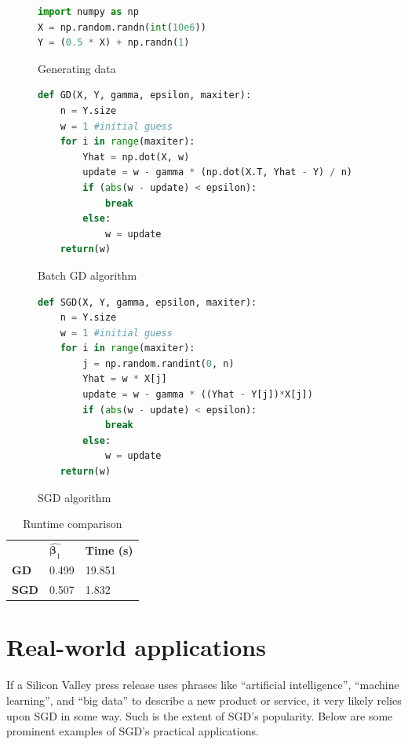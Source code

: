 \documentclass{report}
\begin{document}
\newpage

\begin{figure}[h!]
	\caption{Generating data}
\begin{lstlisting}[language=Python]
import numpy as np
X = np.random.randn(int(10e6))
Y = (0.5 * X) + np.randn(1)
\end{lstlisting}
\end{figure}

\begin{figure}[h!]
	\caption{Batch GD algorithm}
	\begin{lstlisting}[language=Python]
	def GD(X, Y, gamma, epsilon, maxiter):
	n = Y.size
	w = 1 #initial guess
	for i in range(maxiter):
		Yhat = np.dot(X, w)
		update = w - gamma * (np.dot(X.T, Yhat - Y) / n)
		if (abs(w - update) < epsilon): 
			break
		else:
			w = update
	return(w)
	\end{lstlisting}
\end{figure}

\begin{figure}[h!]
	\caption{SGD algorithm}
\begin{lstlisting}[language=Python]
def SGD(X, Y, gamma, epsilon, maxiter):
	n = Y.size
	w = 1 #initial guess
	for i in range(maxiter):
		j = np.random.randint(0, n)
		Yhat = w * X[j]
		update = w - gamma * ((Yhat - Y[j])*X[j])
		if (abs(w - update) < epsilon):
			break
		else:
			w = update
	return(w)
\end{lstlisting}
\end{figure}

\begin{table}[h!]
	\centering
	\caption{Runtime comparison}
	\begin{tabular}{|l l l|}
		\hline
		& $\hat{\bm{\beta}_1}$ & \textbf{Time (s)} \\
		\textbf{GD} & 0.499 & 19.851 \\
		\textbf{SGD} & 0.507 & 1.832 \\
		\hline
	\end{tabular}
\end{table}

\newpage

\section{Real-world applications}

If a Silicon Valley press release uses phrases like ``artificial intelligence'',
``machine learning'', and ``big data'' to describe a new product or service, it very likely
relies upon SGD in some way. Such is the extent of SGD's popularity. 
Below are some prominent examples of SGD's practical
applications.
\end{document}
